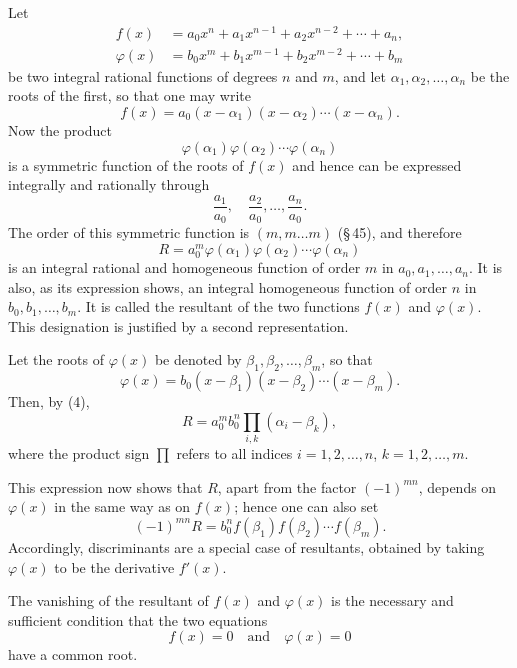 \documentclass[11pt]{article}
\begin{document}
Let
\begin{align}
f(x)&=a_0x^n+a_1x^{n-1}+a_2x^{n-2}+\cdots+a_n,
\tag{1}\\
\varphi(x)&=b_0x^m+b_1x^{m-1}+b_2x^{m-2}+\cdots+b_m
\tag{2}
\end{align}
be two integral rational functions of degrees $n$ and $m$, and let $\alpha_1,\alpha_2,\ldots,\alpha_n$ be the roots of the first, so that one may write
\begin{equation}
f(x)=a_0(x-\alpha_1)(x-\alpha_2)\cdots(x-\alpha_n).
\tag{3}
\end{equation}
Now the product
\[
\varphi(\alpha_1)\varphi(\alpha_2)\cdots\varphi(\alpha_n)
\]
is a symmetric function of the roots of $f(x)$ and hence can be expressed integrally and rationally through
\[
\frac{a_1}{a_0},\quad \frac{a_2}{a_0},\ldots,\frac{a_n}{a_0}.
\]
The order of this symmetric function is $(m,m\ldots m)$ (\S\,45), and therefore
\begin{equation}
R=a_0^m\varphi(\alpha_1)\varphi(\alpha_2)\cdots\varphi(\alpha_n)
\tag{4}
\end{equation}
is an integral rational and homogeneous function of order $m$ in $a_0,a_1,\ldots,a_n$. It is also, as its expression shows, an integral homogeneous function of order $n$ in $b_0,b_1,\ldots,b_m$. It is called the resultant of the two functions $f(x)$ and $\varphi(x)$. This designation is justified by a second representation.

Let the roots of $\varphi(x)$ be denoted by $\beta_1,\beta_2,\ldots,\beta_m$, so that
\begin{equation}
\varphi(x)=b_0(x-\beta_1)(x-\beta_2)\cdots(x-\beta_m).
\tag{5}
\end{equation}
Then, by (4),
\begin{equation}
R=a_0^m b_0^n \prod_{i,k}(\alpha_i-\beta_k),
\tag{6}
\end{equation}
where the product sign $\prod$ refers to all indices $i=1,2,\ldots,n$, $k=1,2,\ldots,m$.

This expression now shows that $R$, apart from the factor $(-1)^{mn}$, depends on $\varphi(x)$ in the same way as on $f(x)$; hence one can also set
\begin{equation}
(-1)^{mn}R=b_0^n f(\beta_1)f(\beta_2)\cdots f(\beta_m).
\tag{7}
\end{equation}
Accordingly, discriminants are a special case of resultants, obtained by taking $\varphi(x)$ to be the derivative $f'(x)$.

The vanishing of the resultant of $f(x)$ and $\varphi(x)$ is the necessary and sufficient condition that the two equations
\[
f(x)=0\quad\text{and}\quad \varphi(x)=0
\]
have a common root.
\end{document}
